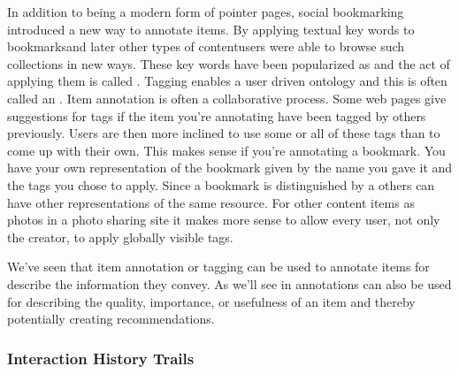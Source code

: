 In addition to being a modern form of pointer pages, social bookmarking
introduced a new way to annotate items. By applying textual key words to
bookmarks\dash{}and later other types of content\dash{}users were able to
browse such collections in new ways. These key words have been popularized as
 and the act of applying them is called . Tagging
enables a user driven ontology%
and this is often called an .
Item annotation is often a collaborative process. Some web pages give
suggestions for tags if the item you're annotating have been tagged by others
previously. Users are then more inclined to use some or all of these tags than
to come up with their own. This makes sense if you're annotating a bookmark.
You have your own representation of the bookmark given by the name you gave it
and the tags you chose to apply. Since a bookmark is distinguished by a
 others can have other representations of the same resource. For
other content items as photos in a photo sharing site it makes more sense to
allow every user, not only the creator, to apply globally visible tags.



We've seen that item annotation or tagging can be used to annotate items for
describe the information they convey. As we'll see in
annotations can also be used for describing the quality, importance, or
usefulness of an item and thereby potentially creating recommendations.

\subsubsection{Interaction History Trails}
\label{section:background.social.navigation.applied.forms.interaction.history}

